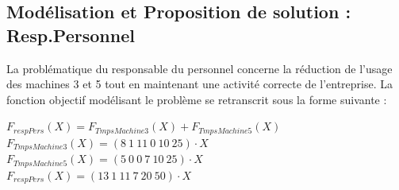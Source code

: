 \documentclass[a4paper, 11pt]{article}
\begin{document}
\subsection{Modélisation et Proposition de solution : Resp.Personnel}
La problématique du responsable du personnel concerne la réduction de l'usage des machines 3 et 5 tout en maintenant une activité correcte de l'entreprise.
La fonction objectif modélisant le problème se retranscrit sous la forme suivante :
\begin{center}
$F_{respPers} (X) =F_{TmpsMachine3} (X) + F_{TmpsMachine5} (X)$\\
$F_{TmpsMachine3} (X) = (8~1~11~0~10~25)\cdot X$\\
$F_{TmpsMachine5} (X) = (5~0~0~7~10~25)\cdot X$\\
$F_{respPers} (X) =(13~1~11~7~20~50)\cdot X$
\end{center}
\end{document}
